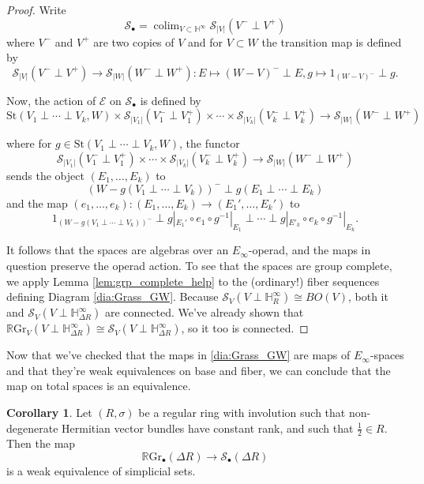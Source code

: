 \documentclass[edeposit,fullpage]{uiucthesis2009}
\newcommand{\mbb}{\mathbb}
\newcommand{\mc}{\mathcal}
\newcommand{\RGr}{\mathbb R\mathrm{Gr}}
\newcommand{\St}{\mathrm{St}}
\DeclareMathOperator*{\colim}{colim}
\theoremstyle{plain}
\numberwithin{lemma}{section}
\theoremstyle{definition}
\newtheorem{corollary}[lemma]{Corollary}
\begin{document}
\begin{proof}
Write
\[
\mc S_\bullet = \colim_{V \subset \mbb H^\infty} \mc S_{|V|}(V^- \perp V^+)
\]
where $V^-$ and $V^+$ are two copies of $V$ and for $V \subset W$ the
transition map is defined by
\[
\mc S_{|V|}(V^- \perp V^+) \rightarrow \mc S_{|W|}(W^- \perp W^+) : E
\mapsto (W-V)^- \perp E, g \mapsto 1_{(W-V)^-} \perp g.
\]

Now, the action of $\mathscr E$ on $\mc S_\bullet$ is defined by
\[
\St(V_1 \perp \cdots \perp V_k,W) \times \mc S_{|V_1|}(V_1^- \perp
V_1^+) \times \cdots \times \mc S_{|V_k|}(V_k^- \perp V_k^+)
\rightarrow \mc S_{|W|}(W^- \perp W^+)
\]

where for $g \in \St(V_1 \perp \cdots \perp V_k,W)$, the functor
\[
\mc S_{|V_1|}(V_1^- \perp V_1^+) \times \cdots \times \mc
S_{|V_k|}(V_k^- \perp V_k^+) \rightarrow \mc S_{|W|}(W^- \perp W^+)
\]
sends the object $(E_1,\dots,E_k)$ to 
\[
(W - g(V_1\perp \cdots \perp V_k))^- \perp g(E_1 \perp \cdots \perp E_k)
\]
and the map $(e_1,\dots,e_k): (E_1,\dots,E_k) \rightarrow
(E_1',\dots,E_k')$ to
\[
1_{(W - g(V_1 \perp \cdots \perp V_k))^-} \perp g|_{E_1'} \circ e_1
\circ g^{-1}|_{E_1} \perp \cdots \perp g|_{E'_k} \circ e_k \circ g^{-1}|_{E_k}.
\]

It follows that the spaces are algebras over an $E_\infty$-operad, and
the maps in question preserve the operad action. To see that the spaces are group complete, we apply Lemma \ref{lem:grp_complete_help} to
the (ordinary!) fiber sequences defining Diagram
\ref{dia:Grass_GW}. Because $\mc S_V(V \perp \mbb H^\infty_R) \cong
BO(V)$, both it and $\mc S_V(V \perp \mbb H^\infty_{\Delta R})$ are
connected. We've already shown that $\RGr_V(V \perp \mbb
H^\infty_{\Delta R}) \cong \mc S_V(V \perp \mbb H^\infty_{\Delta R})$,
so it too is connected. 
\end{proof}

Now that we've checked that the maps in \ref{dia:Grass_GW} are maps of
$E_\infty$-spaces and that they're weak equivalences on base and
fiber, we can conclude that the map on total spaces is an equivalence.

\begin{corollary}\label{cor:RGr_S_eq}
Let $(R,\sigma)$ be a regular ring with involution such that
non-degenerate Hermitian vector bundles have constant rank, and such
that $\frac{1}{2} \in R$. Then the map
\[
\RGr_\bullet(\Delta R) \rightarrow \mc S_\bullet(\Delta R)
\]
is a weak equivalence of simplicial sets.
\end{corollary}
\end{document}
